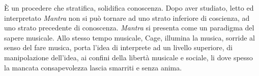 È un procedere che stratifica, solidifica conoscenza. Dopo aver studiato, letto ed interpretato \emph{Mantra} non si può tornare ad uno strato inferiore di coscienza, ad uno strato precedente di conoscenza. \emph{Mantra} si presenta come un paradigma del sapere musicale. Allo stesso tempo musicale, Cage, illumina la musica, sorride al senso del fare musica, porta l'idea di interprete ad un livello superiore, di manipolazione dell'idea, ai confini della libertà musicale e sociale, li dove spesso la mancata consapevolezza lascia smarriti e senza anima.
